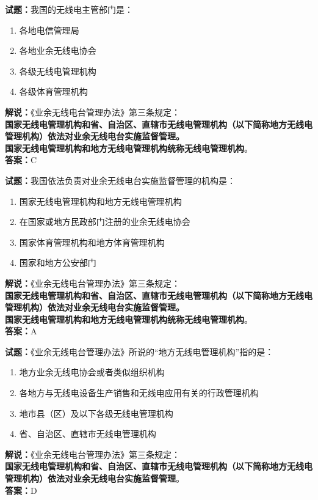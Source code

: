 \documentclass{ctexbook}
\begin{document}
\bigskip

\noindent\textbf{试题：}我国的无线电主管部门是：
\begin{enumerate}[leftmargin=3em]
  \item 各地电信管理局
  \item 各地业余无线电协会
  \item 各级无线电管理机构
  \item 各级体育管理机构
\end{enumerate}
\noindent\textbf{解说：}《业余无线电台管理办法》第三条规定：\\\textbf{国家无线电管理机构和省、自治区、直辖市无线电管理机构（以下简称地方无线电管理机构）依法对业余无线电台实施监督管理。\\
  国家无线电管理机构和地方无线电管理机构统称无线电管理机构}。\\\noindent\textbf{答案：}C

\bigskip

\noindent\textbf{试题：}我国依法负责对业余无线电台实施监督管理的机构是：
\begin{enumerate}[leftmargin=3em]
  \item 国家无线电管理机构和地方无线电管理机构
  \item 在国家或地方民政部门注册的业余无线电协会
  \item 国家体育管理机构和地方体育管理机构
  \item 国家和地方公安部门
\end{enumerate}
\noindent\textbf{解说：}《业余无线电台管理办法》第三条规定：\\\textbf{国家无线电管理机构和省、自治区、直辖市无线电管理机构（以下简称地方无线电管理机构）依法对业余无线电台实施监督管理。\\
  国家无线电管理机构和地方无线电管理机构统称无线电管理机构}。\\\noindent\textbf{答案：}A

\bigskip

\noindent\textbf{试题：}《业余无线电台管理办法》所说的“地方无线电管理机构”指的是：
\begin{enumerate}[leftmargin=3em]
  \item 地方业余无线电协会或者类似组织机构
  \item 各地方与无线电设备生产销售和无线电应用有关的行政管理机构
  \item 地市县（区）及以下各级无线电管理机构
  \item 省、自治区、直辖市无线电管理机构
\end{enumerate}
\noindent\textbf{解说：}《业余无线电台管理办法》第三条规定：\\\textbf{国家无线电管理机构和省、自治区、直辖市无线电管理机构（以下简称地方无线电管理机构）依法对业余无线电台实施监督管理}。\\\noindent\textbf{答案：}D
\end{document}
